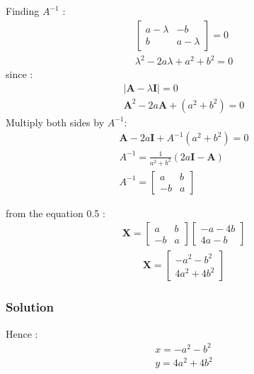 \documentclass{beamer}
\begin{document}
\begin{frame}
Finding $A^{-1}$ :
\begin{align}
    \begin{bmatrix}a-\lambda & -b \\ b & a-\lambda\end{bmatrix} = 0\\
    \lambda^{2} - 2a\lambda + a^{2} + b^{2} = 0
\end{align}
since :
\begin{align}
    \lvert \textbf{A}- \lambda\textbf{I} \rvert = 0\\
    \textbf{A}^{2} -2a\textbf{A} +(a^{2}+b^{2}) =0
\end{align}
Multiply both sides by \textbf{$A^{-1}$}:
\begin{align}
    \textbf{A} -2a\textbf{I}+\textbf{$A^{-1}$}(a^{2}+b^{2}) = 0\\
    \textbf{$A^{-1}$} = \frac{1}{a^{2}+b^{2}} (2a\textbf{I} - \textbf{A})\\
    \textbf{$A^{-1}$}= \begin{bmatrix}a & b \\ -b & a\end{bmatrix}
\end{align}
\end{frame}

 \begin{frame}
from the equation 0.5 :
\begin{align}
    \textbf{X} =\begin{bmatrix}a & b \\ -b & a\end{bmatrix}\begin{bmatrix}-a-4b  \\ 4a -b\end{bmatrix}
\end{align}
\begin{align}
   \textbf{X} =\begin{bmatrix}-a^{2} -b^{2} \\ 4a^{2} + 4b^{2}\end{bmatrix}
\end{align}
\end{frame}

 \begin{frame}
\frametitle{Solution}
Hence :
\begin{align*}
    x = -a^{2} -b^{2}\\
    y = 4a^{2} + 4b^{2}
\end{align*}

\end{frame}
\end{document}
